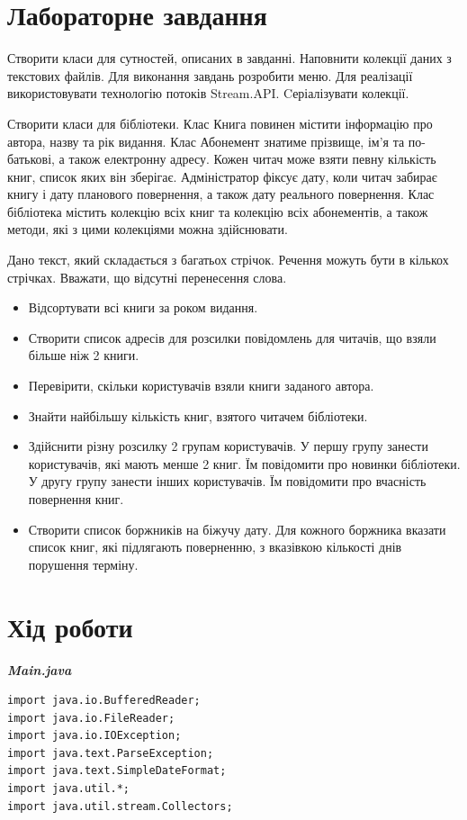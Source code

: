 \documentclass[14pt]{extreport}
\begin{document}
\begin{normalsize}
	\section*{Лабораторне завдання}
Створити класи для сутностей, описаних в завданні. Наповнити колекції даних
з текстових файлів. Для виконання завдань розробити меню. Для реалізації
використовувати технологію потоків Stream.API. Cеріалізувати колекції.	
	
	Створити класи для бібліотеки. Клас Книга повинен містити інформацію про
	автора, назву та рік видання.
	Клас Абонемент знатиме прізвище, ім’я та по-батькові, а також електронну
	адресу.
	Кожен читач може взяти певну кількість книг, список яких він зберігає.
	Адміністратор фіксує дату, коли читач забирає книгу і дату планового
	повернення, а також дату реального повернення.
	Клас бібліотека містить колекцію всіх книг та колекцію всіх абонементів, а
	також методи, які з цими колекціями можна здійснювати.
	
	Дано текст, який складається з багатьох стрічок. Речення можуть бути в кількох
	стрічках. Вважати, що відсутні перенесення слова.
	\begin{itemize}
\item Відсортувати всі книги за роком видання.
\item Створити список адресів для розсилки повідомлень для читачів, що взяли
більше ніж 2 книги.
\item Перевірити, скільки користувачів взяли книги заданого автора.
\item Знайти найбільшу кількість книг, взятого читачем бібліотеки.
\item Здійснити різну розсилку 2 групам користувачів. У першу групу занести
користувачів, які мають менше 2 книг. Їм повідомити про новинки бібліотеки. У
другу групу занести інших користувачів. Їм повідомити про вчасність повернення
книг.
\item  Створити список боржників на біжучу дату. Для кожного боржника вказати
список книг, які підлягають поверненню, з вказівкою кількості днів порушення
терміну.
	\end{itemize}
	\section*{Хід роботи}

	\textbf{\textit{Main.java}}
	\begin{lstlisting}
import java.io.BufferedReader;
import java.io.FileReader;
import java.io.IOException;
import java.text.ParseException;
import java.text.SimpleDateFormat;
import java.util.*;
import java.util.stream.Collectors;


\end{lstlisting}
\end{normalsize}
\end{document}
